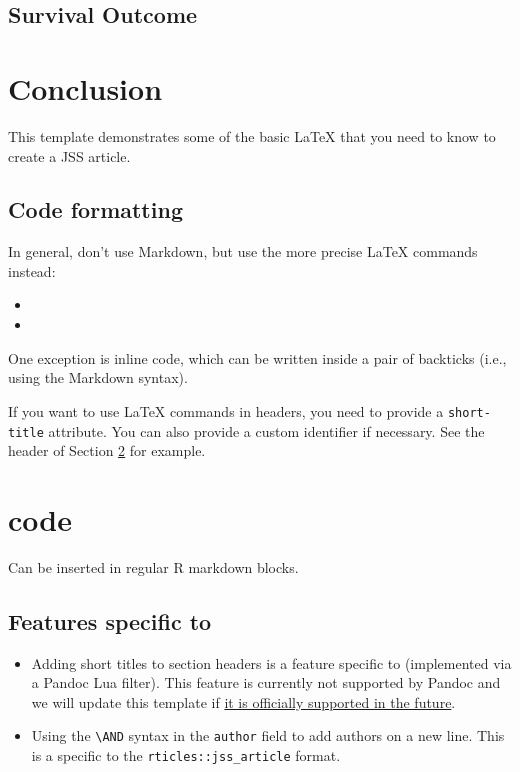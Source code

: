 \documentclass[
]{jss}
\providecommand{\tightlist}{%
  \setlength{\itemsep}{0pt}\setlength{\parskip}{0pt}}
\begin{document}
\hypertarget{survival-outcome}{%
\subsection{Survival Outcome}\label{survival-outcome}}

\hypertarget{conclusion}{%
\section{Conclusion}\label{conclusion}}

This template demonstrates some of the basic LaTeX that you need to know
to create a JSS article.

\hypertarget{code-formatting}{%
\subsection{Code formatting}\label{code-formatting}}

In general, don't use Markdown, but use the more precise LaTeX commands
instead:

\begin{itemize}
\item
\item
\end{itemize}

One exception is inline code, which can be written inside a pair of
backticks (i.e., using the Markdown syntax).

If you want to use LaTeX commands in headers, you need to provide a
\texttt{short-title} attribute. You can also provide a custom identifier
if necessary. See the header of Section \ref{r-code} for example.

\section[R code]{ code}\label{r-code}

Can be inserted in regular R markdown blocks.

\subsection[Features specific to rticles]{Features specific to
}\label{features-specific-to}

\begin{itemize}
\tightlist
\item
  Adding short titles to section headers is a feature specific to
   (implemented via a Pandoc Lua filter). This feature is
  currently not supported by Pandoc and we will update this template if
  \href{https://github.com/jgm/pandoc/issues/4409}{it is officially
  supported in the future}.
\item
  Using the \texttt{\textbackslash{}AND} syntax in the \texttt{author}
  field to add authors on a new line. This is a specific to the
  \texttt{rticles::jss\_article} format.
\end{itemize}
\end{document}
